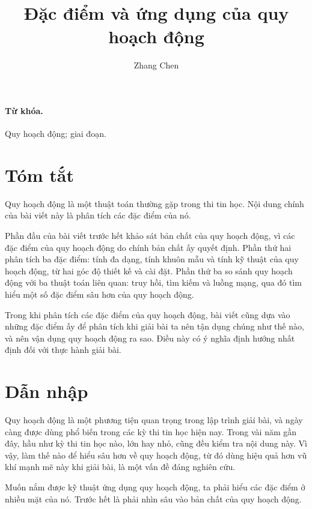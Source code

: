 \documentclass[11pt]{article}
\title{Đặc điểm và ứng dụng của quy hoạch động}
\author{Zhang Chen}
\date{}
\begin{document}
\maketitle


\paragraph{Từ khóa.}
Quy hoạch động; giai đoạn.

\section*{Tóm tắt}

Quy hoạch động là một thuật toán thường gặp trong thi tin học. Nội dung chính
của bài viết này là phân tích các đặc điểm của nó.

Phần đầu của bài viết trước hết khảo sát bản chất của quy hoạch động, vì các
đặc điểm của quy hoạch động do chính bản chất ấy quyết định. Phần thứ hai
phân tích ba đặc điểm: tính đa dạng, tính khuôn mẫu và tính kỹ thuật của quy
hoạch động, từ hai góc độ thiết kế và cài đặt. Phần thứ ba so sánh quy hoạch
động với ba thuật toán liên quan: truy hồi, tìm kiếm và luồng mạng, qua đó
tìm hiểu một số đặc điểm sâu hơn của quy hoạch động.

Trong khi phân tích các đặc điểm của quy hoạch động, bài viết cũng dựa vào
những đặc điểm ấy để phân tích khi giải bài ta nên tận dụng chúng như thế
nào, và nên vận dụng quy hoạch động ra sao. Điều này có ý nghĩa định hướng
nhất định đối với thực hành giải bài.

\tableofcontents

\section{Dẫn nhập}

Quy hoạch động là một phương tiện quan trọng trong lập trình giải bài, và
ngày càng được dùng phổ biến trong các kỳ thi tin học hiện nay. Trong vài năm
gần đây, hầu như kỳ thi tin học nào, lớn hay nhỏ, cũng đều kiểm tra nội dung
này. Vì vậy, làm thế nào để hiểu sâu hơn về quy hoạch động, từ đó dùng hiệu
quả hơn vũ khí mạnh mẽ này khi giải bài, là một vấn đề đáng nghiên cứu.

Muốn nắm được kỹ thuật ứng dụng quy hoạch động, ta phải hiểu các đặc điểm ở
nhiều mặt của nó. Trước hết là phải nhìn sâu vào bản chất của quy hoạch động.
\end{document}
